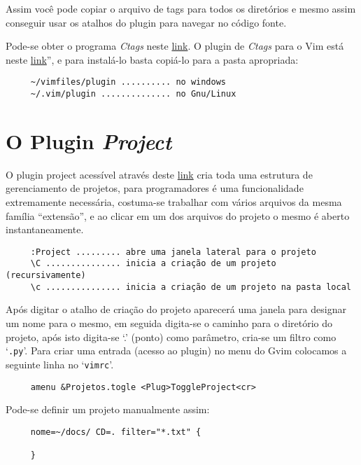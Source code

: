 Assim você pode copiar o arquivo de tags para todos os diretórios e mesmo assim conseguir usar 
os atalhos do plugin para navegar no código fonte.

Pode-se obter o programa {\em Ctags} neste
\href{http://ctags.sourceforge.net/}{link}. O plugin de {\em Ctags} para o Vim está neste 
\href{http://vim.sourceforge.net/scripts/script.php?script\_id=12}{link}'', 
e para instalá-lo basta copiá-lo para a pasta apropriada:
    
\begin{verbatim}
     ~/vimfiles/plugin .......... no windows
     ~/.vim/plugin .............. no Gnu/Linux
\end{verbatim}


\section{O Plugin {\em Project}}

O plugin project acessível através deste \href{http://www.vim.org/scripts/script.php?script\_id=69}{link}
cria toda uma estrutura de gerenciamento de projetos, para programadores é uma funcionalidade
extremamente necessária, costuma-se trabalhar com vários arquivos da mesma família ``extensão'', 
e ao clicar em um dos arquivos do projeto o mesmo é aberto instantaneamente.

\begin{verbatim}
     :Project ......... abre uma janela lateral para o projeto
     \C ............... inicia a criação de um projeto (recursivamente)
     \c ............... inicia a criação de um projeto na pasta local
\end{verbatim}

Após digitar o atalho de criação do projeto aparecerá uma janela para designar um nome
para o mesmo, em seguida digita-se o caminho para o diretório do projeto, após isto
digita-se `.' (ponto) como parâmetro, cria-se um filtro como `{\tt *.py}'.
Para criar uma entrada (acesso ao plugin) no menu do Gvim colocamos
a seguinte linha no `{\tt vimrc}'.

\begin{verbatim}
     amenu &Projetos.togle <Plug>ToggleProject<cr>
\end{verbatim}

Pode-se definir um projeto manualmente assim:

\begin{verbatim}
     nome=~/docs/ CD=. filter="*.txt" {

     }
\end{verbatim}

